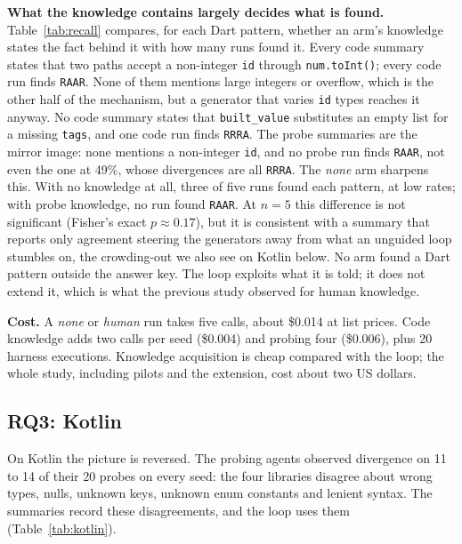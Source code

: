 \textbf{What the knowledge contains largely decides what is found.}
Table~\ref{tab:recall} compares, for each Dart pattern, whether an arm's
knowledge states the fact behind it with how many runs found it. Every
code summary states that two paths accept a non-integer \texttt{id} through
\texttt{num.toInt()}; every code run finds \texttt{RAAR}. None of them
mentions large integers or overflow, which is the other half of the
mechanism, but a generator that varies \texttt{id} types reaches it anyway.
No code summary states that \texttt{built\_value} substitutes an empty
list for a missing \texttt{tags}, and one code run finds \texttt{RRRA}.
The probe summaries are the mirror image: none mentions a non-integer
\texttt{id}, and no probe run finds \texttt{RAAR}, not even the one at
49\%, whose divergences are all \texttt{RRRA}. The \emph{none} arm sharpens
this. With no knowledge at all, three of five runs found each pattern, at low
rates; with probe knowledge, no run found \texttt{RAAR}. At $n{=}5$ this
difference is not significant (Fisher's exact $p \approx 0.17$), but it is
consistent with a summary that reports only agreement steering the
generators away from what an unguided loop stumbles on, the crowding-out we
also see on Kotlin below. No arm found a Dart pattern outside the answer key. The loop exploits what it is told; it does not
extend it, which is what the previous study observed for human knowledge.

\textbf{Cost.} A \emph{none} or \emph{human} run takes five calls, about
\$0.014 at list prices. Code knowledge adds two calls per seed (\$0.004) and
probing four (\$0.006), plus 20 harness executions. Knowledge acquisition is
cheap compared with the loop; the whole study, including pilots and the
extension, cost about two US dollars.

\subsection{RQ3: Kotlin}

On Kotlin the picture is reversed. The probing agents observed divergence
on 11 to 14 of their 20 probes on every seed: the four libraries disagree
about wrong types, nulls, unknown keys, unknown enum constants and lenient
syntax. The summaries record these disagreements, and the loop uses them
(Table~\ref{tab:kotlin}).

